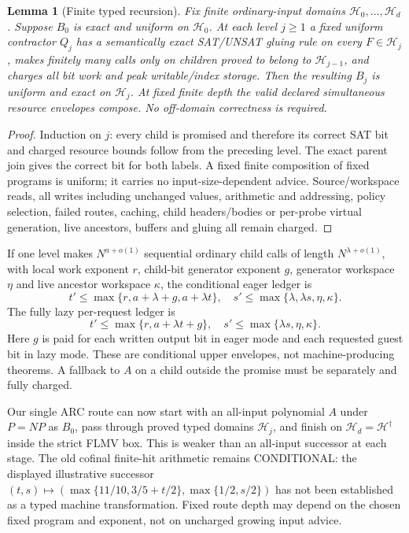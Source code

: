 \documentclass[11pt]{article}
\newtheorem{lemma}[theorem]{Lemma}
\begin{document}
\begin{lemma}[Finite typed recursion]\label{lem:typed}
Fix finite ordinary-input domains $\mathcal H_0,\ldots,\mathcal H_d$.
Suppose $B_0$ is exact and uniform on $\mathcal H_0$.
At each level $j\ge1$ a fixed uniform contractor $Q_j$ has a
semantically exact SAT/UNSAT gluing rule on \emph{every}
$F\in\mathcal H_j$, makes finitely many calls \emph{only} on
children proved to belong to $\mathcal H_{j-1}$, and charges all
bit work and peak writable/index storage.
Then the resulting $B_j$ is uniform and exact on $\mathcal H_j$.
At fixed finite depth the valid declared simultaneous resource
envelopes compose. No off-domain correctness is required.
\end{lemma}
\begin{proof}
Induction on $j$: every child is promised and therefore its correct
SAT bit and charged resource bounds follow from the preceding level.
The exact parent join gives the correct bit for both labels. A fixed
finite composition of fixed programs is uniform; it carries no
input-size-dependent advice. Source/workspace reads, all writes including
unchanged values, arithmetic and addressing, policy selection, failed
routes, caching, child headers/bodies or per-probe virtual generation,
live ancestors, buffers and gluing all remain charged.
\end{proof}
If one level makes $N^{a+o(1)}$ sequential ordinary child calls of
length $N^{\lambda+o(1)}$, with local work exponent $r$, child-bit
generator exponent $g$, generator workspace $\eta$ and live ancestor
workspace $\kappa$, the conditional eager ledger is
\[
t'\le\max\{r,a+\lambda+g,a+\lambda t\},\quad
s'\le\max\{\lambda,\lambda s,\eta,\kappa\}.
\]
The fully lazy per-request ledger is
\[
t'\le\max\{r,a+\lambda t+g\},\quad
s'\le\max\{\lambda s,\eta,\kappa\}.
\]
Here $g$ is paid for each written output bit in eager mode and each
requested guest bit in lazy mode. These are conditional upper envelopes,
not machine-producing theorems. A fallback to $A$ on a child outside
the promise must be separately and fully charged.

Our single ARC route can now start with an all-input polynomial $A$ under
$P=NP$ as $B_0$, pass through proved typed domains $\mathcal H_j$,
and finish on $\mathcal H_d=\mathcal H^\dagger$ inside the strict
FLMV box. This is weaker than an all-input successor at each stage.
The old cofinal finite-hit arithmetic remains CONDITIONAL:
the displayed illustrative successor
$(t,s)\mapsto(\max\{11/10,3/5+t/2\},\max\{1/2,s/2\})$
has not been established as a typed machine transformation.
Fixed route depth may depend on the chosen fixed program and exponent,
not on uncharged growing input advice.
\end{document}
